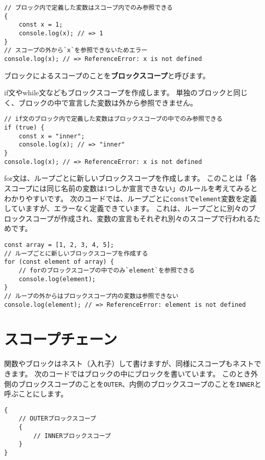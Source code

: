 \begin{lstlisting}
// ブロック内で定義した変数はスコープ内でのみ参照できる
{
    const x = 1;
    console.log(x); // => 1
}
// スコープの外から`x`を参照できないためエラー
console.log(x); // => ReferenceError: x is not defined
\end{lstlisting}

ブロックによるスコープのことを\textbf{ブロックスコープ}と呼びます。

if文やwhile文などもブロックスコープを作成します。
単独のブロックと同じく、ブロックの中で宣言した変数は外から参照できません。

\begin{lstlisting}
// if文のブロック内で定義した変数はブロックスコープの中でのみ参照できる
if (true) {
    const x = "inner";
    console.log(x); // => "inner"
}
console.log(x); // => ReferenceError: x is not defined
\end{lstlisting}

for文は、ループごとに新しいブロックスコープを作成します。
このことは「各スコープには同じ名前の変数は1つしか宣言できない」のルールを考えてみるとわかりやすいです。
次のコードでは、ループごとに\texttt{const}で\texttt{element}変数を定義していますが、エラーなく定義できています。
これは、ループごとに別々のブロックスコープが作成され、変数の宣言もそれぞれ別々のスコープで行われるためです。

\begin{lstlisting}
const array = [1, 2, 3, 4, 5];
// ループごとに新しいブロックスコープを作成する
for (const element of array) {
    // forのブロックスコープの中でのみ`element`を参照できる
    console.log(element);
}
// ループの外からはブロックスコープ内の変数は参照できない
console.log(element); // => ReferenceError: element is not defined
\end{lstlisting}

\hypertarget{scope-chain}{%
\section{スコープチェーン}\label{scope-chain}}

関数やブロックはネスト（入れ子）して書けますが、同様にスコープもネストできます。
次のコードではブロックの中にブロックを書いています。
このとき外側のブロックスコープのことを\texttt{OUTER}、内側のブロックスコープのことを\texttt{INNER}と呼ぶことにします。

\begin{lstlisting}
{
    // OUTERブロックスコープ
    {
        // INNERブロックスコープ
    }
}
\end{lstlisting}

